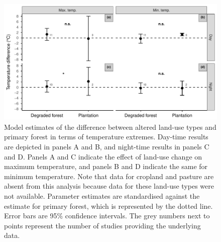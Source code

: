 \documentclass[12pt,a4paper,]{report}
\theoremstyle{definition}
\theoremstyle{definition}
\theoremstyle{definition}
\theoremstyle{remark}
\begin{document}
\begin{figure}[H]

{\centering \includegraphics{./output/fig-A-5-1} 

}

\caption{Model estimates of the difference between altered land-use
types and primary forest in terms of temperature extremes. Day-time
results are depicted in panels A and B, and night-time results in panels
C and D. Panels A and C indicate the effect of land-use change on
maximum temperature, and panels B and D indicate the same for minimum
temperature. Note that data for cropland and pasture are absent from
this analysis because data for these land-use types were not available.
Parameter estimates are standardised against the estimate for primary
forest, which is represented by the dotted line. Error bars are 95\%
confidence intervals. The grey numbers next to points represent the
number of studies providing the underlying data.}\label{fig:fig-A-5}
\end{figure}
\end{document}
